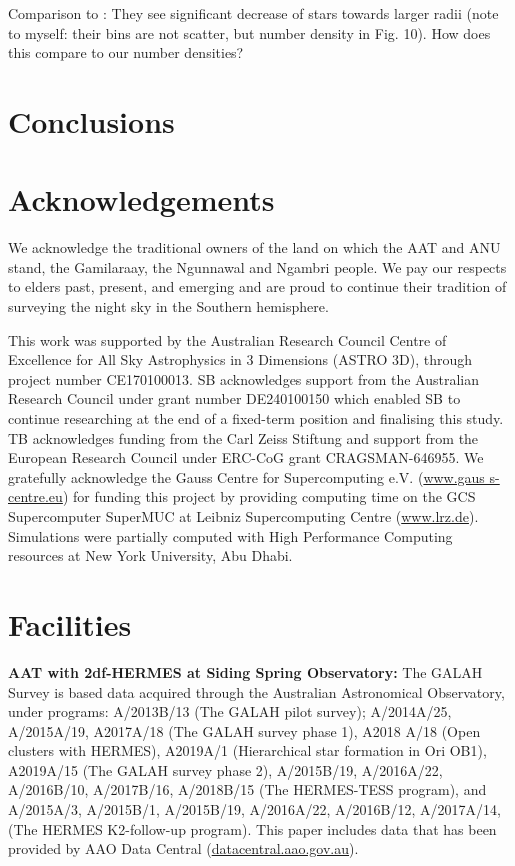 \documentclass[fleqn,usenatbib]{mnras}
\begin{document}
Comparison to \citet[][see their Fig. 10]{Minchev2014b}: They see significant decrease of stars towards larger radii (note to myself: their bins are not scatter, but number density in Fig. 10). How does this compare to our number densities?


\section{Conclusions}
\label{sec:conc}


\section*{Acknowledgements}

We acknowledge the traditional owners of the land on which the AAT and ANU stand, the Gamilaraay, the Ngunnawal and Ngambri people. We pay our respects to elders past, present, and emerging and are proud to continue their tradition of surveying the night sky in the Southern hemisphere.

This work was supported by the Australian Research Council Centre of Excellence for All Sky Astrophysics in 3 Dimensions (ASTRO 3D), through project number CE170100013. SB acknowledges support from the Australian Research Council under grant number DE240100150 which enabled SB to continue researching at the end of a fixed-term position and finalising this study. TB acknowledges funding from the Carl Zeiss Stiftung and support from the European Research Council under ERC-CoG grant CRAGSMAN-646955. We gratefully acknowledge the Gauss Centre for Supercomputing e.V. (\url{www.gaus s-centre.eu}) for funding this project by providing computing time on the GCS Supercomputer SuperMUC at Leibniz Supercomputing Centre (\url{www.lrz.de}). Simulations were partially computed with High Performance Computing resources at New York University, Abu Dhabi.

\section*{Facilities}

\textbf{AAT with 2df-HERMES at Siding Spring Observatory:} The GALAH Survey is based data acquired through the Australian Astronomical Observatory, under programs: A/2013B/13 (The GALAH pilot survey); A/2014A/25, A/2015A/19, A2017A/18 (The GALAH survey phase 1), A2018 A/18 (Open clusters with HERMES), A2019A/1 (Hierarchical star formation in Ori OB1), A2019A/15 (The GALAH survey phase 2), A/2015B/19, A/2016A/22, A/2016B/10, A/2017B/16, A/2018B/15 (The HERMES-TESS program), and A/2015A/3, A/2015B/1, A/2015B/19, A/2016A/22, A/2016B/12, A/2017A/14, (The HERMES K2-follow-up program). This paper includes data that has been provided by AAO Data Central (\url{datacentral.aao.gov.au}).
\end{document}
